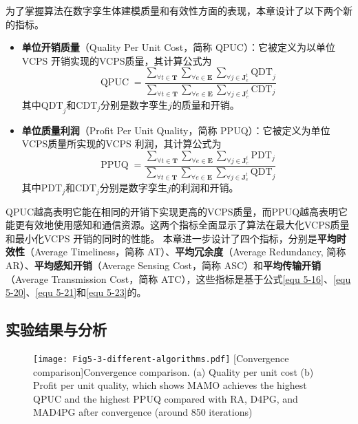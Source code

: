 为了掌握算法在数字孪生体建模质量和有效性方面的表现，本章设计了以下两个新的指标。
\begin{itemize}
	\item \textbf{单位开销质量}（Quality Per Unit Cost，简称 QPUC）：它被定义为以单位VCPS 开销实现的VCPS质量，其计算公式为
		\begin{equation}
			\operatorname{QPUC}=\frac{\sum_{\forall t \in \mathbf{T}} \sum_{\forall e \in \mathbf{E}} \sum_{\forall j \in \mathbf{J}_e^t} \mathrm{QDT}_j}{\sum_{\forall t \in \mathbf{T}} \sum_{\forall e \in \mathbf{E}} \sum_{\forall j \in \mathbf{J}_e^t} \mathrm{CDT}_j}
		\end{equation}
		其中$\mathrm{QDT}_j$和$\mathrm{CDT}_j$分别是数字孪生$j$的质量和开销。
	\item \textbf{单位质量利润}（Proﬁt Per Unit Quality，简称 PPUQ）：它被定义为单位VCPS质量所实现的VCPS 利润，其计算公式为
		\begin{equation}
		\operatorname{PPUQ}=\frac{\sum_{\forall t \in \mathbf{T}} \sum_{\forall e \in \mathbf{E}} \sum_{\forall j \in \mathbf{J}_e^t}\mathrm{PDT}_j}{\sum_{\forall t \in \mathbf{T}} \sum_{\forall e \in \mathbf{E}} \sum_{\forall j \in \mathbf{J}_e^t} \mathrm{QDT}_j}
		\end{equation}
		其中$\mathrm{PDT}_j$和$\mathrm{CDT}_j$分别是数字孪生$j$的利润和开销。
\end{itemize}
QPUC越高表明它能在相同的开销下实现更高的VCPS质量，而PPUQ越高表明它能更有效地使用感知和通信资源。这两个指标全面显示了算法在最大化VCPS质量和最小化VCPS 开销的同时的性能。
本章进一步设计了四个指标，分别是\textbf{平均时效性}（Average Timeliness，简称 AT）、\textbf{平均冗余度}（Average Redundancy, 简称AR）、\textbf{平均感知开销}（Average Sensing Cost，简称 ASC）和\textbf{平均传输开销}（Average Transmission Cost，简称 ATC），这些指标是基于公式\ref{equ 5-16}、\ref{equ 5-20}、\ref{equ 5-21}和\ref{equ 5-23}的。 

\subsection{实验结果与分析}

\begin{figure}[h]
 \centering
 \texttt{[image: Fig5-3-different-algorithms.pdf]}
 [Convergence comparison]{Convergence comparison. (a) Quality per unit cost (b) Profit per unit quality, which shows MAMO achieves the highest QPUC and the highest PPUQ compared with RA, D4PG, and MAD4PG after convergence (around 850 iterations)}
 \label{fig 5-3}
\end{figure}

